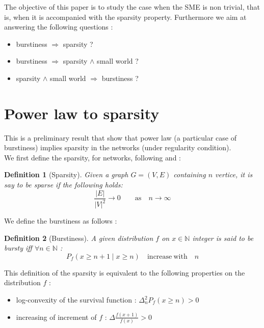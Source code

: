 \documentclass[a4paper, 12pt]{article}
\newtheorem{definition}{Definition}[section]
\begin{document}
The objective of this paper is to study the case when the SME is non trivial, that is, when it is accompanied with the sparsity property. Furthermore we aim at answering the following questions : 
\begin{itemize}
    \item burstiness $\Rightarrow$ sparsity ?
    \item burstiness $\Rightarrow$ sparsity  $\wedge$ small world ? 
    \item sparsity  $\wedge$ small world $\Rightarrow$ burstiness ? 
\end{itemize}

\section{Power law to sparsity}
This is a preliminary result that show that power law (a particular case of burstiness) implies sparsity in the networks (under regularity condition).~\\

We first define the sparsity, for networks, following \cite{orbanz2015bayesian} and \cite{veitch2015class} : 
\begin{definition}[Sparsity]
    Given a graph $G = (V,E)$ containing $n$ vertice, it is say to be sparse if the following holds:
    \begin{equation}
        \frac{|E|}{|V|^2} \rightarrow 0 \qquad \mathrm{as} \quad  n \rightarrow \infty  
    \end{equation}
\end{definition}


We define the burstiness as follows :
\begin{definition}[Burstiness]
    A given distribution $f$ on $x \in \mathbb{N}$ integer is said to be bursty iff $\forall n \in \mathbb{N} $ :
    \begin{equation}
        P_f(x \geq n+1 \mid x \geq n) \quad  \mathrm{increase\ with} \quad n
    \end{equation}
\end{definition}

This definition of the sparsity is equivalent to the following properties on the distribution $f$ : 
\begin{itemize}
    \item log-convexity of the survival function : $\Delta_n^2 P_f(x \geq n) > 0$
    \item increasing of increment of $f$ : $\Delta \frac{f(x+1)}{f(x)} > 0$
\end{itemize}
\end{document}
